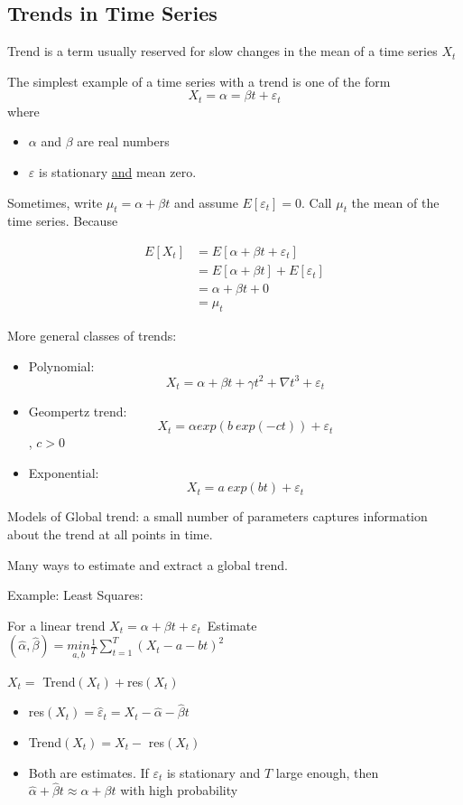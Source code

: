 \subsection{Trends in Time Series}


Trend is a term usually reserved for slow changes in the mean of a time series $X_t$

The simplest example of a time series with a trend is one of the form 
$$X_t = \alpha = \beta t + \varepsilon_t$$
where \begin{itemize}
    \item $\alpha$ and $\beta$ are real numbers
    \item $\varepsilon$ is stationary \underline{and} mean zero.
\end{itemize}
Sometimes, write $\mu_t = \alpha + \beta t$ and assume $E[\varepsilon_t]=0$. Call $\mu_t$ the mean of the time series. Because

\begin{align*}
    E[X_t] &= E[\alpha + \beta t + \varepsilon_t] \\
    &= E[\alpha + \beta t] + E[\varepsilon_t] \\
    &= \alpha + \beta t + 0\\
    &= \mu_t
\end{align*}

More general classes of trends:
\begin{itemize}
    \item Polynomial: 
    $$X_t=\alpha+\beta t +\gamma t^2 + \nabla t^3 + \varepsilon_t$$
    \item Geompertz trend:
    $$ X_t = \alpha exp(b\ exp(-ct)) + \varepsilon_t$$, $c>0$
    \item Exponential:
    $$X_t =a\ exp(bt) + \varepsilon_t$$
\end{itemize}
Models of Global trend: a small number of parameters captures information about the trend at all points in time.

Many ways to estimate and extract a global trend.

Example: \quad Least Squares:
\begin{adjustwidth}{2em}{0pt}
For a linear trend $X_t=\alpha + \beta t + \varepsilon_t$\
Estimate $(\hat{\alpha}, \hat{\beta})=\underset{a,b}{min} \frac{1}{T} \sum_{t=1}^T (X_t-a-bt)^2$
\end{adjustwidth}

$X_t =$ Trend$(X_t) + $res$(X_t)$
\begin{itemize}
    \item res$(X_t)=\hat{\varepsilon}_t=X_t-\hat{\alpha} -\hat{\beta}t $
    \item Trend$(X_t)=X_t-$ res$(X_t)$
    \item Both are estimates. If $\varepsilon_t$ is stationary and $T$ large enough, then $\hat{\alpha}+\hat{\beta}t \approx \alpha+\beta t$ with high probability
\end{itemize}

